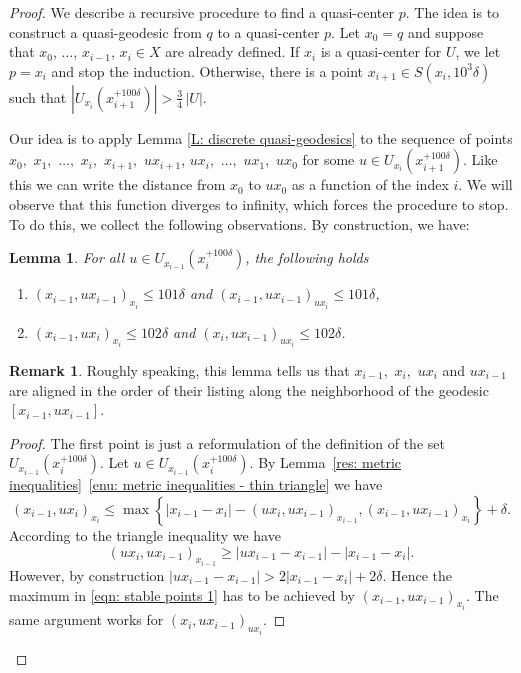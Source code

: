 \documentclass[JEP,XML,SOM,Unicode, NoEqCountersInSection,published]{cedram}
\theoremstyle{plain}
\newtheorem{lem}[thm]{Lemma}
\theoremstyle{definition}
\newtheorem{rem}[thm]{Remark}
\begin{document}
\begin{proof}
We describe a recursive procedure to find a quasi-center $p$.
The idea is to construct a quasi-geodesic from $q$ to a quasi-center $p$.
Let $x_0=q$ and suppose that $x_0$, $\ldots$, $x_{i-1}$, $x_i\in X$ are already defined.
If $x_i$ is a quasi-center for $U$, we let $p=x_i$ and stop the induction.
Otherwise, there is a point $x_{i+1} \in S(x_i,10^3\delta)$ such that $|U_{x_i}(x_{i+1}^{+ 100 \delta})| > \frac{3}{4}\, |U|$.

Our idea is to apply Lemma \ref{L: discrete quasi-geodesics} to the sequence of points $x_0,$ $x_1,$ $\dots,$ $x_i,$ $x_{i+1},$ $ux_{i+1}$, $ ux_i,$ $\dots,$ $ux_1,$ $ux_0$ for some $u \in U_{x_i}(x_{i+1}^{+ 100 \delta})$. Like this we can write the distance from $x_0$ to $ux_0$ as a function of the index $i$.
We will observe that this function diverges to infinity, which forces the procedure to stop.
To do this, we collect the following observations. By construction, we have:

\begin{lem}\label{L: stable points 1}
For all $u \in U_{x_{i-1}}(x_{i}^{+100\delta})$, the following holds
\begin{enumerate}
\item $(x_{i-1},ux_{i-1})_{x_i}\leqslant 101\delta$ and $(x_{i-1},u{x_{i-1}})_{ux_i}\leqslant 101\delta$,
\item $(x_{i-1},ux_i)_{x_i} \leq 102\delta$ and $(x_i, ux_{i-1})_{ux_i} \leq 102\delta$.
\end{enumerate}
\end{lem}

\begin{rem}
Roughly speaking, this lemma tells us that $x_{i-1},$ $x_i,$ $ux_i$ and $ux_{i-1}$ are aligned in the order of their listing along the neighborhood of the geodesic $[x_{i-1},ux_{i-1}]$.
\end{rem}

\skpt
\begin{proof}
The first point is just a reformulation of the definition of the set~$U_{x_{i-1}}(x_{i}^{+100\delta})$.
Let $u \in U_{x_{i-1}}(x_{i}^{+100\delta})$.
By Lemma~\ref{res: metric inequalities}~\eqref{enu: metric inequalities - thin triangle} we have
\begin{equation}
\label{eqn: stable points 1}
(x_{i-1},ux_i)_{x_i}\leq \max \left\{|x_{i-1}- x_i| - (ux_i, ux_{i-1})_{x_{i-1}}, (x_{i-1},ux_{i-1})_{x_i}\right\} + \delta.
\end{equation}
According to the triangle inequality we have
\begin{equation*}
(ux_i, ux_{i-1})_{x_{i-1}} \geq |ux_{i-1} - x_{i-1}| - |x_{i-1} - x_i|.
\end{equation*}
However, by construction $|ux_{i-1} - x_{i-1}| > 2|x_{i-1} - x_i| + 2\delta$.
Hence the maximum in \eqref{eqn: stable points 1} has to be achieved by $(x_{i-1},ux_{i-1})_{x_i}$.
The same argument works for $(x_i, ux_{i-1})_{ux_i}$.
\end{proof}


\end{proof}
\end{document}
